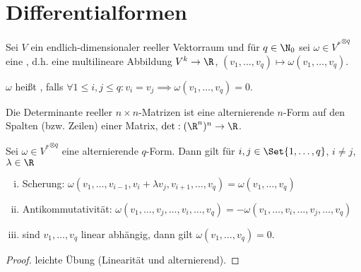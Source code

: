 \chapter{Differentialformen}

\begin{df} \label{6.1}
    Sei $V$ ein endlich-dimensionaler reeller Vektorraum und für $q \in \N_0$ sei $\omega \in {V^*}^{\otimes q}$ eine , d.h. eine multilineare Abbildung $V^k \to \R$, $(v_1, \dotsc, v_q) \mapsto \omega(v_1, \dotsc, v_q)$.

    $\omega$ heißt , falls $\forall 1 \le i,j \le q: v_i = v_j \implies \omega(v_1, \dotsc, v_q) = 0$.
\end{df}

\begin{ex*}
    Die Determinante reeller $n\times n$-Matrizen ist eine alternierende $n$-Form auf den Spalten (bzw. Zeilen) einer Matrix, $\det: (\R^n)^n \to \R$.
\end{ex*}

\begin{lem} \label{6.2}
    Sei $\omega \in {V^*}^{\otimes q}$ eine alternierende $q$-Form.
    Dann gilt für $i,j \in \Set{1, \dotsc, q}$, $i \neq j$, $\lambda \in \R$
    \begin{enumerate}[(i)]
        \item
            Scherung:
            \begin{math}
                \omega(v_1, \dotsc, v_{i-1}, v_i + \lambda v_j, v_{i+1}, \dotsc, v_q) = \omega(v_1, \dotsc, v_q)
            \end{math}
        \item
            Antikommutativität:
            \begin{math}
                \omega(v_1, \dotsc, v_j, \dotsc, v_i, \dotsc, v_q) = - \omega(v_1, \dotsc, v_i, \dotsc, v_j, \dotsc, v_q)
            \end{math}
        \item
            sind $v_1, \dotsc, v_q$ linear abhängig, dann gilt $\omega(v_1, \dotsc, v_q) = 0$.
    \end{enumerate}
    \begin{proof}
        leichte Übung (Linearität und alternierend).
    \end{proof}
\end{lem}



